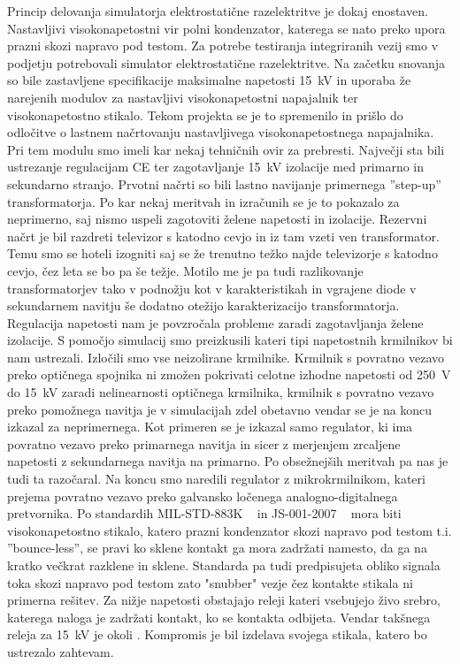 \documentclass[a4paper,twoside,openright,12pt,Slovene]{book}
\begin{document}
Princip delovanja simulatorja elektrostatične razelektritve je dokaj enostaven. Nastavljivi visokonapetostni vir polni kondenzator, katerega se nato preko upora prazni skozi napravo pod testom.    
Za potrebe testiranja integriranih vezij smo v podjetju potrebovali simulator elektrostatične razelektritve. Na začetku snovanja so bile zastavljene specifikacije maksimalne napetosti \SI{15}{\kilo\volt} in uporaba že narejenih modulov za nastavljivi visokonapetostni napajalnik ter visokonapetostno stikalo. Tekom projekta se je to spremenilo in prišlo do odločitve o lastnem načrtovanju nastavljivega visokonapetostnega napajalnika. Pri tem modulu smo imeli kar nekaj tehničnih ovir za prebresti. Največji sta bili ustrezanje regulacijam CE ter zagotavljanje \SI{15}{\kilo\volt} izolacije med primarno in sekundarno stranjo.
Prvotni načrti so bili lastno navijanje primernega ''step-up'' transformatorja. Po kar nekaj meritvah in izračunih se je to pokazalo za neprimerno, saj nismo uspeli zagotoviti želene napetosti in izolacije. Rezervni načrt je bil razdreti televizor s katodno cevjo in iz tam vzeti ven transformator. Temu smo se hoteli izogniti saj se že trenutno težko najde televizorje s katodno cevjo, čez leta se bo pa še težje. Motilo me je pa tudi razlikovanje transformatorjev tako v podnožju kot v karakteristikah in vgrajene diode v sekundarnem navitju še dodatno otežijo karakterizacijo transformatorja. 
Regulacija napetosti nam je povzročala probleme zaradi zagotavljanja želene izolacije. S pomočjo simulacij smo preizkusili kateri tipi napetostnih krmilnikov bi nam ustrezali. Izločili smo vse neizolirane krmilnike. Krmilnik s povratno vezavo preko optičnega spojnika ni zmožen pokrivati celotne izhodne napetosti od \SI{250}{\volt} do \SI{15}{\kilo\volt} zaradi nelinearnosti optičnega krmilnika, krmilnik s povratno vezavo preko pomožnega navitja je v simulacijah zdel obetavno vendar se je na koncu izkazal za neprimernega. Kot primeren se je izkazal samo regulator, ki ima povratno vezavo preko primarnega navitja in sicer z merjenjem zrcaljene napetosti z sekundarnega navitja na primarno. Po obsežnejših meritvah pa nas je tudi ta razočaral. Na koncu smo naredili regulator z mikrokrmilnikom, kateri prejema povratno vezavo preko galvansko ločenega analogno-digitalnega pretvornika.
Po standardih MIL-STD-883K ~\cite{MIL-STD-883K} in JS-001-2007 ~\cite{JS-001-2017} mora biti visokonapetostno stikalo, katero prazni kondenzator skozi napravo pod testom t.i. ''bounce-less'', se pravi ko sklene kontakt ga mora zadržati namesto, da ga na kratko večkrat razklene in sklene. Standarda pa tudi predpisujeta obliko signala toka skozi napravo pod testom zato "snubber" vezje čez kontakte stikala ni primerna rešitev. Za nižje napetosti obstajajo releji kateri vsebujejo živo srebro, katerega naloga je zadržati kontakt, ko se kontakta odbijeta. Vendar takšnega releja za \SI{15}{\kilo\volt} je okoli .
Kompromis je bil izdelava svojega stikala, katero bo ustrezalo zahtevam.
\end{document}
